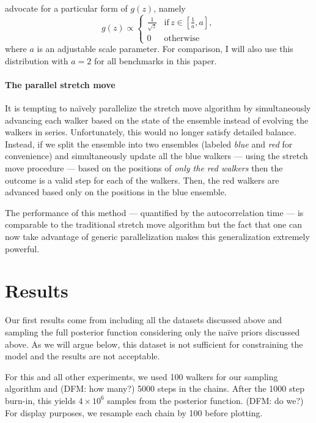 \documentclass[preprint]{aastex}
\begin{document}
\citet{Goodman:2010} advocate for a particular form of $g(z)$, namely
\begin{equation}
    g(z) \propto \left \{ \begin{array}{ll}
        \displaystyle\frac{1}{\sqrt{z}} & \mathrm{if}\, z\in \left [ \displaystyle\frac{1}{a}, a \right ], \\
        0 & \mathrm{otherwise}
    \end{array} \right .
\end{equation}
where $a$ is an adjustable scale parameter. For comparison, I will also use this
distribution with $a=2$ for all benchmarks in this paper.

\paragraph{The parallel stretch move}

It is tempting to na\"ively parallelize the stretch move algorithm by
simultaneously advancing each walker based on the state of the ensemble
instead of evolving the walkers in series. Unfortunately, this would no longer
satisfy detailed balance. Instead, if we split the ensemble into two ensembles
(labeled \emph{blue} and \emph{red} for convenience) and simultaneously update
all the blue walkers --- using the stretch move procedure --- based on the
positions of \emph{only the
red walkers} then the outcome is a valid step for each of the walkers. Then,
the red walkers are advanced based only on the positions in the blue ensemble.

The performance of this method --- quantified by the autocorrelation time ---
is comparable to the traditional stretch move algorithm but the fact that one
can now take advantage of generic parallelization makes this generalization
extremely powerful.

\section{Results}

Our first results come from including all the datasets discussed above and
sampling the full posterior function considering only the na\"ive priors
discussed above. As we will argue below, this dataset is not sufficient
for constraining the model and the results are not acceptable.

For this and all other experiments, we used 100 walkers for our sampling
algorithm and (DFM: how many?) 5000 steps in the chains. After the 1000
step burn-in, this yields $4\times10^6$ samples from the posterior function.
(DFM: do we?) For display purposes, we resample each chain by 100 before
plotting.
\end{document}
